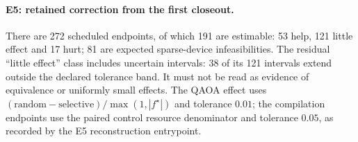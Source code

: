 \paragraph{E5: retained correction from the first closeout.}
There are 272 scheduled endpoints, of which 191 are estimable: 53 help,
121 little effect and 17 hurt; 81 are expected sparse-device infeasibilities.
The residual ``little effect'' class includes uncertain intervals: 38 of its
121 intervals extend outside the declared tolerance band. It must not be
read as evidence of equivalence or uniformly small effects. The QAOA effect
uses $(\mathrm{random}-\mathrm{selective})/\max(1,|f^\star|)$ and tolerance
$0.01$; the compilation endpoints use the paired control resource denominator
and tolerance $0.05$, as recorded by the E5 reconstruction entrypoint.
